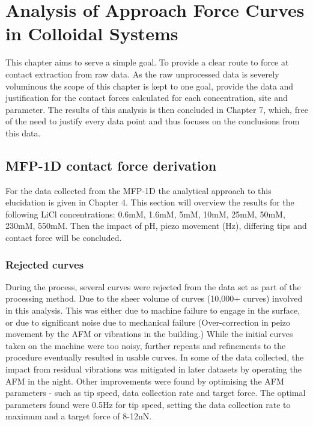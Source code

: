 


\chapter{Analysis of Approach Force Curves in Colloidal Systems}
\label{chap:approach_force_curves}

This chapter aims to serve a simple goal. To provide a clear route to force at contact extraction from raw data. As the raw unprocessed data is severely voluminous the scope of this chapter is kept to one goal, provide the data and justification for the contact forces calculated for each concentration, site and parameter. The results of this analysis is then concluded in Chapter 7, which, free of the need to justify every data point and thus focuses on the conclusions from this data. 

\section{MFP-1D contact force derivation}

For the data collected from the MFP-1D the analytical approach to this elucidation is given in Chapter 4. This section will overview the results for the following LiCl concentrations: 0.6mM, 1.6mM, 5mM, 10mM, 25mM, 50mM, 230mM, 550mM. Then the impact of pH, piezo movement (Hz), differing tips and contact force will be concluded.

\subsection{Rejected curves}

 During the process, several curves were rejected from the data set as part of the processing method. Due to the sheer volume of curves (10,000+ curves) involved in this analysis.  This was either due to machine failure to engage in the surface, or due to significant noise due to mechanical failure (Over-correction in peizo movement by the AFM or vibrations in the building.) While the initial curves taken on the machine were too noisy, further repeats and refinements to the procedure eventually resulted in usable curves. In some of the data collected, the impact from residual vibrations was mitigated in later datasets by operating the AFM in the night. Other improvements were found by optimising the AFM parameters  - such as tip speed, data collection rate and target force. The optimal parameters found were 0.5Hz for tip speed, setting the data collection rate to maximum and a target force of 8-12nN. 

